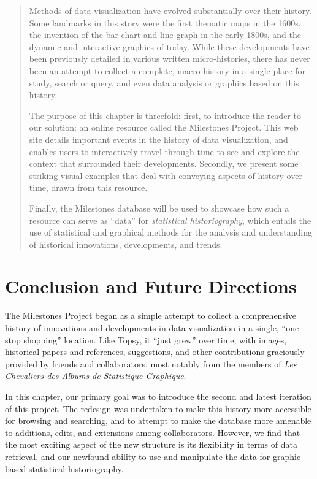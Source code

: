 \documentclass[11pt]{article}
\begin{document}
\begin{abstract}
Methods of data visualization have evolved substantially over their history.
Some landmarks in this story were the first thematic maps in the 1600s, the invention of the bar chart and line graph in the early 1800s,
and the dynamic and interactive graphics of today.  
While these developments have been previously detailed in various written micro-histories, 
there has never been an attempt to collect a complete, macro-history in a single place for study, search or query, and even data analysis or graphics based on this history.

The purpose of this chapter is threefold: first, to introduce the reader to our solution: an online resource called the Milestones Project. 
This web site details  important events in the history of data visualization, and enables users to interactively travel through time to see and explore the context that surrounded their developments. 
Secondly, we present some striking visual examples that deal with conveying aspects of history over time, drawn from this resource.

Finally, the Milestones database will be used to showcase how such a resource can serve as ``data'' for \emph{statistical historiography}, which entails the use of statistical and graphical methods for the analysis and understanding of historical innovations, developments, and trends.
\end{abstract}


\section{Conclusion and Future Directions}
The Milestones Project began as a simple attempt to collect a comprehensive history of innovations and developments in data visualization in a single, ``one-stop shopping'' location.
Like Topsy, it ``just grew'' over time, with images, historical papers and references, suggestions, and other contributions graciously provided by friends and collaborators, most notably from the members of \emph{Les Chevaliers des Albums de Statistique Graphique}.

In this chapter, our primary goal was to introduce the second and latest iteration of this project.
The redesign was undertaken to make this history more accessible for browsing and searching, and to attempt to make the database more amenable to additions, edits, and extensions among collaborators.  
However, we find that the most exciting aspect of the new structure is its flexibility in terms of data retrieval, 
and our newfound ability to use and manipulate the data for graphic-based statistical historiography.
\end{document}

